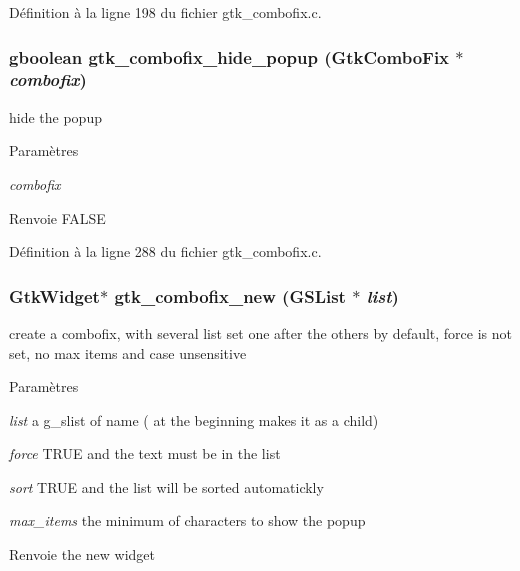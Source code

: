 Définition à la ligne 198 du fichier gtk\_\-combofix.c.

\subsubsection[{gtk\_\-combofix\_\-hide\_\-popup}]{\setlength{\rightskip}{0pt plus 5cm}gboolean gtk\_\-combofix\_\-hide\_\-popup ({\bf GtkComboFix} $\ast$ {\em combofix})}\label{gtk__combofix_8c_a37b13db2ce7129dcca712862f118d531}
hide the popup


\begin{DoxyParams}{Paramètres}
\item[{\em combofix}]\end{DoxyParams}
\begin{DoxyReturn}{Renvoie}
FALSE 
\end{DoxyReturn}


Définition à la ligne 288 du fichier gtk\_\-combofix.c.

\subsubsection[{gtk\_\-combofix\_\-new}]{\setlength{\rightskip}{0pt plus 5cm}GtkWidget$\ast$ gtk\_\-combofix\_\-new (GSList $\ast$ {\em list})}\label{gtk__combofix_8c_a7642341a194730bea49a96c515349870}
create a combofix, with several list set one after the others by default, force is not set, no max items and case unsensitive


\begin{DoxyParams}{Paramètres}
\item[{\em list}]a g\_\-slist of name ( at the beginning makes it as a child) \item[{\em force}]TRUE and the text must be in the list \item[{\em sort}]TRUE and the list will be sorted automatickly \item[{\em max\_\-items}]the minimum of characters to show the popup\end{DoxyParams}
\begin{DoxyReturn}{Renvoie}
the new widget 
\end{DoxyReturn}


